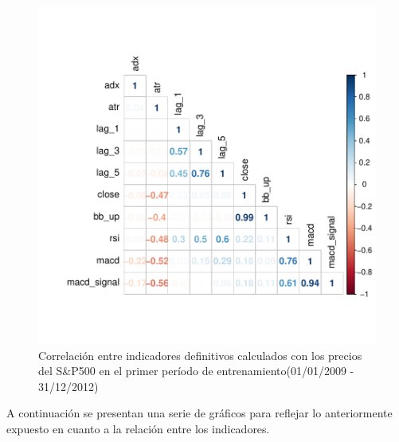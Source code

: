 \documentclass[a4paper,12pt]{Latex/Classes/PhDthesisPSnPDF}
\begin{document}
\begin{figure}[H]
\centering
\includegraphics{main-007}
\caption{Correlación entre indicadores definitivos calculados con los precios del S\&P500 en el primer período de entrenamiento(01/01/2009 - 31/12/2012)}
\end{figure}

A continuación se presentan una serie de gráficos para reflejar lo anteriormente expuesto en cuanto a la relación entre los indicadores.
\end{document}
